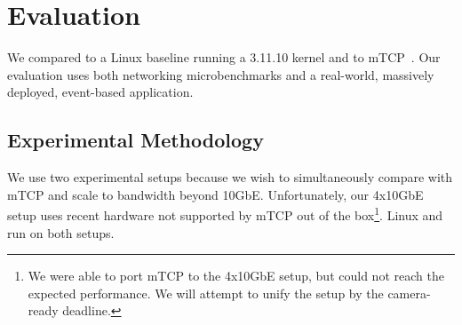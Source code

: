 
\section{Evaluation}
\label{sec:eval}

We compared \ix to a Linux baseline running a 3.11.10 kernel and to
mTCP~\cite{jeong2014mtcp}. Our evaluation uses both networking
microbenchmarks and a real-world, massively deployed, event-based
application.



\subsection{Experimental Methodology}
\label{sec:eval:setup}

We use two experimental setups because we wish to simultaneously
compare with mTCP and scale to bandwidth beyond 10GbE.  Unfortunately,
our 4x10GbE setup uses recent hardware not supported by mTCP out of
the box\footnote{We were able to port mTCP to the 4x10GbE setup, but
  could not reach the expected performance.  We will attempt to unify
  the setup by the camera-ready deadline.}.  Linux and \ix run on both
setups.



